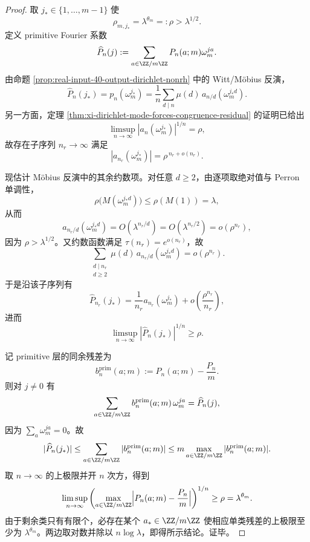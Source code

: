 \begin{proof}
取 \(j_\ast\in\{1,\dots,m-1\}\) 使
\[
\rho_{m,j_\ast}=\lambda^{\theta_m}=:\rho>\lambda^{1/2}.
\]
定义 primitive Fourier 系数
\[
\widehat P_n(j):=\sum_{a\in\ZZ/m\ZZ}P_n(a;m)\omega_m^{ja}.
\]
由命题 \ref{prop:real-input-40-output-dirichlet-nonrh} 中的 Witt/M\"obius 反演，
\[
\widehat P_n(j_\ast)
=
p_n(\omega_m^{j_\ast})
=
\frac{1}{n}\sum_{d\mid n}\mu(d)\,a_{n/d}(\omega_m^{j_\ast d}).
\]
另一方面，定理 \ref{thm:xi-dirichlet-mode-forces-congruence-residual} 的证明已给出
\[
\limsup_{n\to\infty}|a_n(\omega_m^{j_\ast})|^{1/n}=\rho,
\]
故存在子序列 \(n_r\to\infty\) 满足
\[
|a_{n_r}(\omega_m^{j_\ast})|=\rho^{\,n_r+o(n_r)}.
\]

现估计 Möbius 反演中的其余约数项。对任意 \(d\ge 2\)，由逐项取绝对值与 Perron 单调性，
\[
\rho\!\bigl(M(\omega_m^{j_\ast d})\bigr)\le \rho(M(1))=\lambda,
\]
从而
\[
a_{n_r/d}(\omega_m^{j_\ast d})=O(\lambda^{n_r/d})=O(\lambda^{n_r/2})=o(\rho^{n_r}),
\]
因为 \(\rho>\lambda^{1/2}\)。又约数函数满足 \(\tau(n_r)=e^{o(n_r)}\)，故
\[
\sum_{\substack{d\mid n_r\\ d\ge 2}}\mu(d)\,a_{n_r/d}(\omega_m^{j_\ast d})=o(\rho^{n_r}).
\]
于是沿该子序列有
\[
\widehat P_{n_r}(j_\ast)
=
\frac{1}{n_r}a_{n_r}(\omega_m^{j_\ast})+o\!\left(\frac{\rho^{n_r}}{n_r}\right),
\]
进而
\[
\limsup_{n\to\infty}|\widehat P_n(j_\ast)|^{1/n}\ge \rho.
\]

记 primitive 层的同余残差为
\[
b_n^{\mathrm{prim}}(a;m):=P_n(a;m)-\frac{P_n}{m}.
\]
则对 \(j\neq 0\) 有
\[
\sum_{a\in\ZZ/m\ZZ} b_n^{\mathrm{prim}}(a;m)\,\omega_m^{ja}
=
\widehat P_n(j),
\]
因为 \(\sum_a\omega_m^{ja}=0\)。故
\[
|\widehat P_n(j_\ast)|
\le
\sum_{a\in\ZZ/m\ZZ}|b_n^{\mathrm{prim}}(a;m)|
\le
m\max_{a\in\ZZ/m\ZZ}|b_n^{\mathrm{prim}}(a;m)|.
\]
取 \(n\to\infty\) 的上极限并开 \(n\) 次方，得到
\[
\limsup_{n\to\infty}
\left(
\max_{a\in\ZZ/m\ZZ}\Bigl|P_n(a;m)-\frac{P_n}{m}\Bigr|
\right)^{1/n}
\ge
\rho=\lambda^{\theta_m}.
\]
由于剩余类只有有限个，必存在某个 \(a_\ast\in\ZZ/m\ZZ\) 使相应单类残差的上极限至少为 \(\lambda^{\theta_m}\)。两边取对数并除以 \(n\log\lambda\)，即得所示结论。证毕。
\end{proof}

